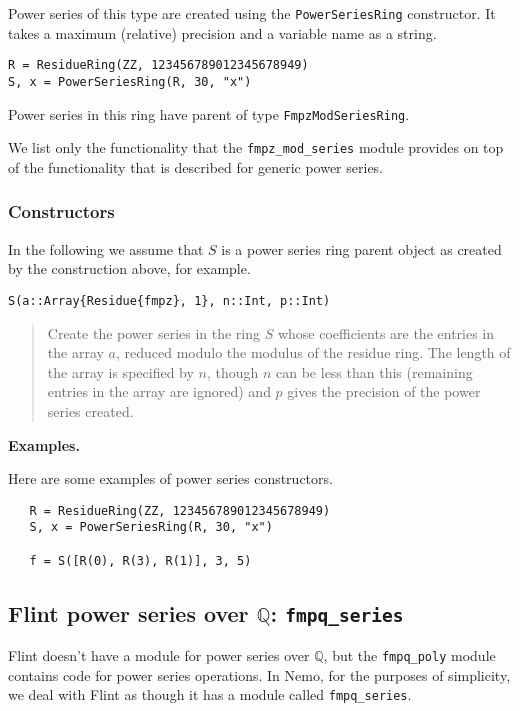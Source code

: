\documentclass[a4paper,10pt]{article}
\newcommand{\Q}{\mathbb{Q}}
\newcommand{\code}{\lstinline}
\newcommand{\desc}[1]{\vspace{-3mm}\begin{quote}#1\end{quote}}
\begin{document}
{{Power series of this type are created using the \code{PowerSeriesRing} constructor.
It takes a maximum (relative) precision and a variable name as a string.

\begin{lstlisting}
R = ResidueRing(ZZ, 123456789012345678949)
S, x = PowerSeriesRing(R, 30, "x")
\end{lstlisting}

Power series in this ring have parent of type \code{FmpzModSeriesRing}.

We list only the functionality that the \code{fmpz_mod_series} module provides on top of
the functionality that is described for generic power series.

\subsubsection{Constructors}

In the following we assume that $S$ is a power series ring parent object as created
by the construction above, for example.

\begin{lstlisting}
S(a::Array{Residue{fmpz}, 1}, n::Int, p::Int)
\end{lstlisting}

\desc{Create the power series in the ring $S$ whose coefficients are the entries in
the array $a$, reduced modulo the modulus of the residue ring. The length of the
array is specified by $n$, though $n$ can be less than this (remaining entries in the
array are ignored) and $p$ gives the precision of the power series created.}

\textbf{Examples.}

Here are some examples of power series constructors.

\begin{lstlisting}
   R = ResidueRing(ZZ, 123456789012345678949)
   S, x = PowerSeriesRing(R, 30, "x")

   f = S([R(0), R(3), R(1)], 3, 5)
\end{lstlisting}

\subsection{Flint power series over $\Q$: \code{fmpq_series}}

Flint doesn't have a module for power series over $\Q$, but the \code{fmpq_poly}
module contains code for power series operations. In Nemo, for the purposes of
simplicity, we deal with Flint as though it has a module called \code{fmpq_series}.

}}
\end{document}
